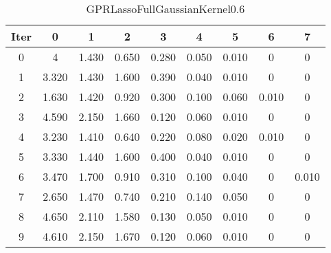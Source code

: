 \begin{table}
	\begin{center}
		\begin{tabular}{|c|c|c|c|c|c|c|c|c|}
			\hline
			Iter & 0 & 1 & 2 & 3 & 4 & 5 & 6 & 7 \\
			\hline
			0 & 4 & 1.430 & 0.650 & 0.280 & 0.050 & 0.010 & 0 & 0 \\
			\hline
			1 & 3.320 & 1.430 & 1.600 & 0.390 & 0.040 & 0.010 & 0 & 0 \\
			\hline
			2 & 1.630 & 1.420 & 0.920 & 0.300 & 0.100 & 0.060 & 0.010 & 0 \\
			\hline
			3 & 4.590 & 2.150 & 1.660 & 0.120 & 0.060 & 0.010 & 0 & 0 \\
			\hline
			4 & 3.230 & 1.410 & 0.640 & 0.220 & 0.080 & 0.020 & 0.010 & 0 \\
			\hline
			5 & 3.330 & 1.440 & 1.600 & 0.400 & 0.040 & 0.010 & 0 & 0 \\
			\hline
			6 & 3.470 & 1.700 & 0.910 & 0.310 & 0.100 & 0.040 & 0 & 0.010 \\
			\hline
			7 & 2.650 & 1.470 & 0.740 & 0.210 & 0.140 & 0.050 & 0 & 0 \\
			\hline
			8 & 4.650 & 2.110 & 1.580 & 0.130 & 0.050 & 0.010 & 0 & 0 \\
			\hline
			9 & 4.610 & 2.150 & 1.670 & 0.120 & 0.060 & 0.010 & 0 & 0 \\
			\hline
		\end{tabular}
	\end{center}
	\caption{GPRLassoFullGaussianKernel0.6}
\end{table}
